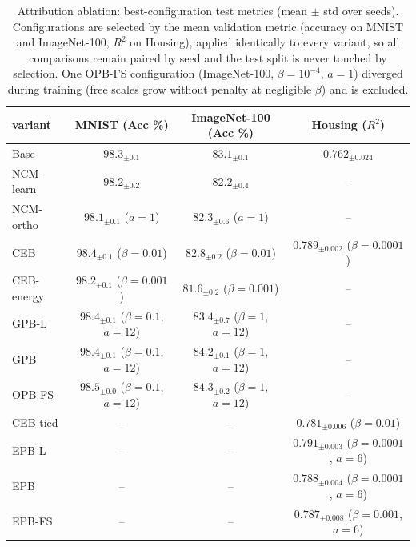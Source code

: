 \begin{table}[t]
\centering
\scriptsize
\begin{tabular}{l c c c}
\hline
variant & MNIST (Acc \%) & ImageNet-100 (Acc \%) & Housing ($R^2$) \\
\hline
Base & $98.3_{\pm 0.1}$ & $83.1_{\pm 0.1}$ & $0.762_{\pm 0.024}$ \\
NCM-learn & $98.2_{\pm 0.2}$ & $82.2_{\pm 0.4}$ & -- \\
NCM-ortho & $98.1_{\pm 0.1}$ ($a=1$) & $82.3_{\pm 0.6}$ ($a=1$) & -- \\
CEB & $98.4_{\pm 0.1}$ ($\beta=0.01$) & $82.8_{\pm 0.2}$ ($\beta=0.01$) & $0.789_{\pm 0.002}$ ($\beta=0.0001$) \\
CEB-energy & $98.2_{\pm 0.1}$ ($\beta=0.001$) & $81.6_{\pm 0.2}$ ($\beta=0.001$) & -- \\
GPB-L & $98.4_{\pm 0.1}$ ($\beta=0.1$, $a=12$) & $83.4_{\pm 0.7}$ ($\beta=1$, $a=12$) & -- \\
GPB & $98.4_{\pm 0.1}$ ($\beta=0.1$, $a=12$) & $84.2_{\pm 0.1}$ ($\beta=1$, $a=12$) & -- \\
OPB-FS & $98.5_{\pm 0.0}$ ($\beta=0.1$, $a=12$) & $84.3_{\pm 0.2}$ ($\beta=1$, $a=12$) & -- \\
CEB-tied & -- & -- & $0.781_{\pm 0.006}$ ($\beta=0.01$) \\
EPB-L & -- & -- & $0.791_{\pm 0.003}$ ($\beta=0.0001$, $a=6$) \\
EPB & -- & -- & $0.788_{\pm 0.004}$ ($\beta=0.0001$, $a=6$) \\
EPB-FS & -- & -- & $0.787_{\pm 0.008}$ ($\beta=0.001$, $a=6$) \\
\hline
\end{tabular}
\caption{Attribution ablation: best-configuration test metrics (mean $\pm$ std
over seeds). Configurations are selected by the mean validation metric
(accuracy on MNIST and ImageNet-100, $R^2$ on Housing), applied identically to
every variant, so all comparisons remain paired by seed and the test split is
never touched by selection. One OPB-FS configuration (ImageNet-100,
$\beta = 10^{-4}$, $a = 1$) diverged during training (free scales grow without
penalty at negligible $\beta$) and is excluded.}
\label{tab:ablation}
\end{table}
